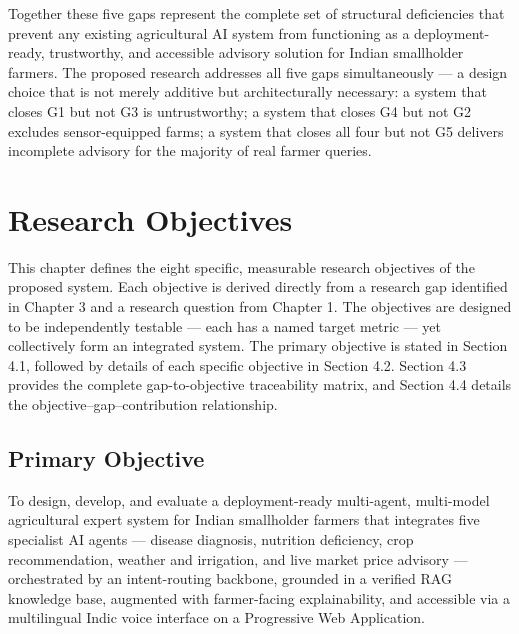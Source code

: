 \documentclass[12pt,a4paper]{article}
\begin{document}
Together these five gaps represent the complete set of structural deficiencies that prevent any existing agricultural AI system from functioning as a deployment-ready, trustworthy, and accessible advisory solution for Indian smallholder farmers. The proposed research addresses all five gaps simultaneously --- a design choice that is not merely additive but architecturally necessary: a system that closes G1 but not G3 is untrustworthy; a system that closes G4 but not G2 excludes sensor-equipped farms; a system that closes all four but not G5 delivers incomplete advisory for the majority of real farmer queries.

\newpage
\section{Research Objectives}
This chapter defines the eight specific, measurable research objectives of the proposed system. Each objective is derived directly from a research gap identified in Chapter 3 and a research question from Chapter 1. The objectives are designed to be independently testable --- each has a named target metric --- yet collectively form an integrated system. The primary objective is stated in Section 4.1, followed by details of each specific objective in Section 4.2. Section 4.3 provides the complete gap-to-objective traceability matrix, and Section 4.4 details the objective--gap--contribution relationship.

\subsection{Primary Objective}
To design, develop, and evaluate a deployment-ready multi-agent, multi-model agricultural expert system for Indian smallholder farmers that integrates five specialist AI agents --- disease diagnosis, nutrition deficiency, crop recommendation, weather and irrigation, and live market price advisory --- orchestrated by an intent-routing backbone, grounded in a verified RAG knowledge base, augmented with farmer-facing explainability, and accessible via a multilingual Indic voice interface on a Progressive Web Application.
\end{document}

